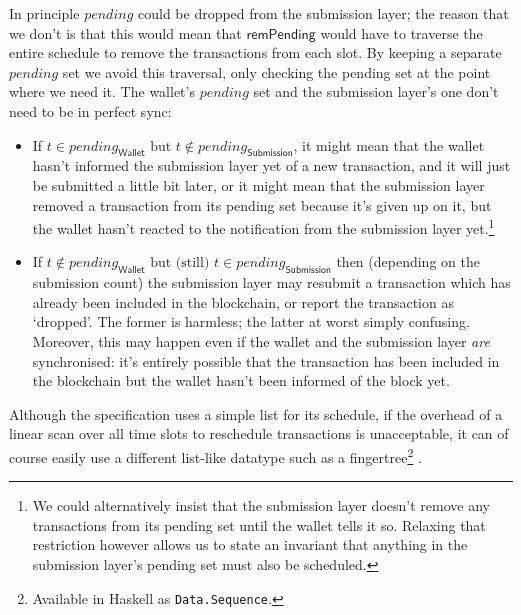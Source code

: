 \documentclass{article}
\theoremstyle{definition}{
  \newtheorem{lemma}{Lemma}[section] %
  \newtheorem{definition}[lemma]{Definition}
}
\theoremstyle{theorem}{
  \newtheorem{invariant}[lemma]{Invariant}
  \newtheorem{proofobligation}[lemma]{Proof Obligation}
}
\numberwithin{equation}{lemma}
\begin{document}
In principle $\mathit{pending}$ could be dropped from the submission layer; the
reason that we don't is that this would mean that $\mathsf{remPending}$ would
have to traverse the entire schedule to remove the transactions from each slot.
By keeping a separate $\mathit{pending}$ set we avoid this traversal, only
checking the pending set at the point where we need it. The wallet's
$\mathit{pending}$ set and the submission layer's one don't need to be in
perfect sync:
%
\begin{itemize}
\item If
\begin{math}
t \in    \mathit{pending}_\mathsf{Wallet} \text{ but }
t \notin \mathit{pending}_\mathsf{Submission}
\end{math},
it might mean that the wallet hasn't informed the submission layer yet of a
new transaction, and it will just be submitted a little bit later, or it might
mean that the submission layer removed a transaction from its pending set
because it's given up on it, but the wallet hasn't reacted to the notification
from the submission layer yet.\footnote{We could alternatively insist that the
submission layer doesn't remove any transactions from its pending set until
the wallet tells it so. Relaxing that restriction however allows us to state
an invariant that anything in the submission layer's pending set must also
be scheduled.}

\item If
\begin{math}
t \notin \mathit{pending}_\mathsf{Wallet} \text{ but (still) }
t \in    \mathit{pending}_\mathsf{Submission}
\end{math}
then (depending on the submission count) the submission layer may resubmit a
transaction which has already been included in the blockchain, or report the
transaction as `dropped'. The former is harmless; the latter at worst simply
confusing. Moreover,  this may happen even if the wallet and the submission
layer \emph{are} synchronised: it's entirely possible that the transaction has
been included in the blockchain but the wallet hasn't been informed of the block
yet.
\end{itemize}

Although the specification uses a simple list for its schedule, if the overhead
of a linear scan over all time slots to reschedule transactions is unacceptable,
it can of course easily use a different list-like datatype such as a
fingertree\footnote{Available in Haskell as \texttt{Data.Sequence}.}
\citep{hinze_paterson_2006}.
\end{document}

